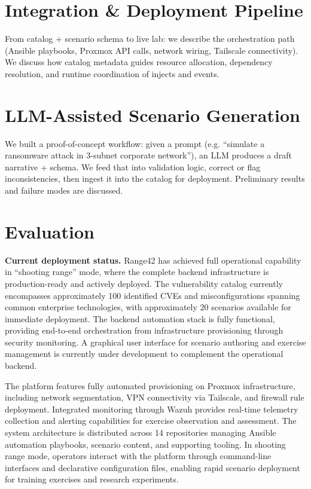 \documentclass[11pt]{article}
\begin{document}
\section{Integration \& Deployment Pipeline}
From catalog + scenario schema to live lab: we describe the orchestration path (Ansible playbooks, Proxmox API calls, network wiring, Tailscale connectivity). We discuss how catalog metadata guides resource allocation, dependency resolution, and runtime coordination of injects and events.

\section{LLM-Assisted Scenario Generation}
We built a proof-of-concept workflow: given a prompt (e.g. “simulate a ransomware attack in 3-subnet corporate network”), an LLM produces a draft narrative + schema. We feed that into validation logic, correct or flag inconsistencies, then ingest it into the catalog for deployment. Preliminary results and failure modes are discussed.

\section{Evaluation}


\textbf{Current deployment status.} 
Range42 has achieved full operational capability in ``shooting range'' mode, where the complete backend infrastructure is production-ready and actively deployed.
The vulnerability catalog currently encompasses approximately 100 identified CVEs and misconfigurations spanning common enterprise technologies, with approximately 20 scenarios available for immediate deployment.
The backend automation stack is fully functional, providing end-to-end orchestration from infrastructure provisioning through security monitoring.
A graphical user interface for scenario authoring and exercise management is currently under development to complement the operational backend.

The platform features fully automated provisioning on Proxmox infrastructure, including network segmentation, VPN connectivity via Tailscale, and firewall rule deployment.
Integrated monitoring through Wazuh provides real-time telemetry collection and alerting capabilities for exercise observation and assessment.
The system architecture is distributed across 14 repositories managing Ansible automation playbooks, scenario content, and supporting tooling.
In shooting range mode, operators interact with the platform through command-line interfaces and declarative configuration files, enabling rapid scenario deployment for training exercises and research experiments.
\end{document}
